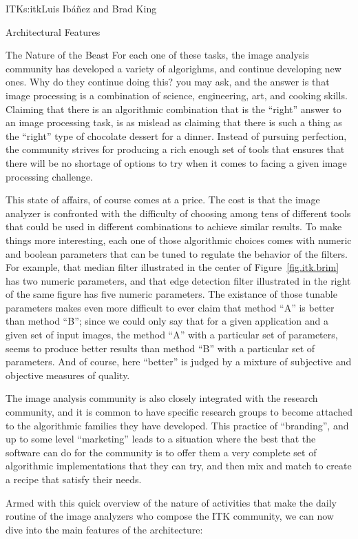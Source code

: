 \begin{aosachapter}{ITK}{s:itk}{Luis Ib\'{a}\~{n}ez and Brad King}
\begin{aosasect1}{Architectural Features}
\begin{aosasect2}{The Nature of the Beast}
For each one of these tasks, the image analysis community has developed a
variety of algorighms, and continue developing new ones. Why do they continue
doing this? you may ask, and the answer is that image processing is a
combination of science, engineering, art, and cooking skills. Claiming that
there is an algorithmic combination that is the ``right'' answer to an image
processing task, is as mislead as claiming that there is such a thing as the
``right'' type of chocolate dessert for a dinner. Instead of pursuing
perfection, the community strives for producing a rich enough set of tools that
ensures that there will be no shortage of options to try when it comes to
facing a given image processing challenge.

This state of affairs, of course comes at a price. The cost is that the image
analyzer is confronted with the difficulty of choosing among tens of different
tools that could be used in different combinations to achieve similar results.
To make things more interesting, each one of those algorithmic choices comes
with numeric and boolean parameters that can be tuned to regulate the behavior
of the filters. For example, that median filter illustrated in the center of
Figure~\ref{fig.itk.brim} has two numeric parameters, and that edge detection
filter illustrated in the right of the same figure has five numeric parameters.
The existance of those tunable parameters makes even more difficult to ever
claim that method ``A'' is better than method ``B''; since we could only say
that for a given application and a given set of input images, the method ``A''
with a particular set of parameters, seems to produce better results than
method ``B'' with a particular set of parameters.  And of course, here
``better'' is judged by a mixture of subjective and objective measures of
quality.

The image analysis community is also closely integrated with the research
community, and it is common to have specific research groups to become attached
to the algorithmic families they have developed. This practice of ``branding'',
and up to some level ``marketing'' leads to a situation where the best that the
software can do for the community is to offer them a very complete set of
algorithmic implementations that they can try, and then mix and match to create
a recipe that satisfy their needs.

Armed with this quick overview of the nature of activities that make the daily
routine of the image analyzers who compose the ITK community, we can now dive
into the main features of the architecture:


\end{aosasect2}
\end{aosasect1}
\end{aosachapter}
